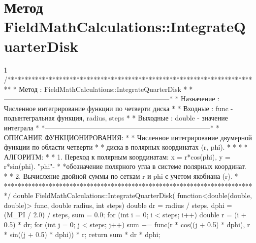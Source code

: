 \section{Метод FieldMathCalculations::IntegrateQuarterDisk}
\footnotesize
\begin{listing}{1}
/*************************************************************************
* Метод         : FieldMathCalculations::IntegrateQuarterDisk            *
*------------------------------------------------------------------------*
* Назначение    : Численное интегрирование функции по четверти диска     *
* Входные       : func - подынтегральная функция, radius, steps          *
* Выходные      : double - значение интеграла                            *
*------------------------------------------------------------------------*
* ОПИСАНИЕ ФУНКЦИОНИРОВАНИЯ:                                             *
* Численное интегрирование двумерной функции по области четверти         *
* диска в полярных координатах (r, phi).                                 *
* *
* АЛГОРИТМ:                                                              *
* 1. Переход к полярным координатам: x = r*cos(phi), y = r*sin(phi). "phi"-   *
*обозначение полярного угла в системе полярных координат. *
* 2. Вычисление двойной суммы по сеткам r и phi с учетом якобиана (r).   *
*************************************************************************/
double FieldMathCalculations::IntegrateQuarterDisk(
    function<double(double, double)> func, double radius, int steps) {
    double dr = radius / steps, dphi = (M_PI / 2.0) / steps, sum = 0.0;
    for (int i = 0; i < steps; i++) {
        double r = (i + 0.5) * dr;
        for (int j = 0; j < steps; j++) {
            sum += func(r * cos((j + 0.5) * dphi), 
                        r * sin((j + 0.5) * dphi)) * r;
        }
    }
    return sum * dr * dphi;
}
\end{listing}
\normalsize

\pagebreak